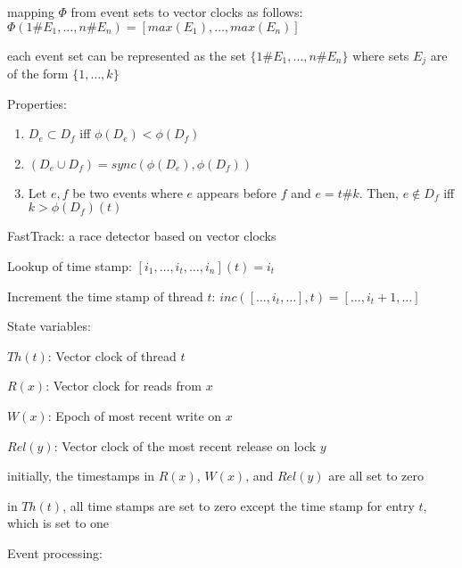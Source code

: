\documentclass[landscape, a4paper]{article}
\begin{document}
\begin{minipage}[t]{0.2\linewidth}
\begin{betterlist}
\begin{betterlist}
\begin{betterlist}
				\begin{betterlist}
					\item mapping $\Phi$ from event sets to vector clocks as follows: $\Phi({1\#E_1 , \ldots, n\#E_n}) = [max(E_1), \ldots, max(E_n)]$
					\begin{betterlist}
						\item each event set can be represented as the set $\{1\#E_1, \ldots, 𝑛\#E_n\}$ where sets $E_j$ are of the form $\{1, \ldots, k\}$
					\end{betterlist}
					\item \alert{Properties:}
					\begin{enumerate}
						\item $D_e \subset D_f$ iff $\phi(D_e) < \phi(D_f)$
						\item $(D_e \cup D_f) = sync(\phi(D_e), \phi(D_f))$
						\item Let $e, f$ be two events where $e$ appears before $f$ and $e = t\#k$. Then, $e \not\in D_f$ iff $k > \phi(D_f)(t)$
					\end{enumerate}
					\item \alert{FastTrack:} a race detector based on vector clocks
					\begin{betterlist}
						\item Lookup of time stamp: $[i_1,\ldots,i_t,\ldots,i_n](t) = i_t$
						\item Increment the time stamp of thread $t$: $inc([\ldots,i_t,\ldots],t) = [\ldots,i_t+1,\ldots]$
						\item \alert{State variables:}
						\begin{betterlist}
							\item $Th(t)$: Vector clock of thread $t$
							\item $R(x)$: Vector clock for reads from $x$
							\item $W(x)$: Epoch of most recent write on $x$
							\item $Rel(y)$: Vector clock of the most recent release on lock $y$
						\end{betterlist}
						\item initially, the timestamps in $R(x)$, $W(x)$, and $Rel(y)$ are all set to zero
						\item in $Th(t)$, all time stamps are set to zero except the time stamp for entry $t$, which is set to one
						\item \alert{Event processing:}


\end{betterlist}
\end{betterlist}
\end{betterlist}
\end{betterlist}
\end{betterlist}
\end{minipage}
\end{document}
